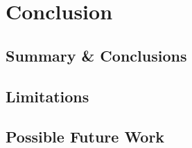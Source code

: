 \chapter{Conclusion \label{sec:conclusion}}

\section{Summary \& Conclusions \label{sec:summary}}

\section{Limitations \label{sec: limitations}}


\section{Possible Future Work \label{sec:future_work}}
